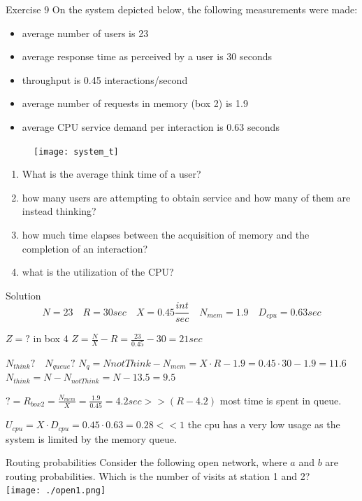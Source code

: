 \documentclass[]{beamer}
\begin{document}
\begin{frame}[allowframebreaks]{Exercise 9}
On the system depicted below, the following measurements were made:
\begin{itemize}
	\item average number of users is 23
	\item average response time as perceived by a user is 30 seconds
	\item throughput is 0.45 interactions/second
	\item average number of requests in memory (box 2) is 1.9
	\item average CPU service demand per interaction is 0.63 seconds
\end{itemize}


\begin{figure}
	\centering
	\texttt{[image: system\_t]}
\end{figure}

\begin{enumerate}
	\item What is the average think time of a user?
	\item how many users are attempting to obtain service and how many of them are instead thinking?
	\item how much time elapses between the acquisition of memory and the completion of an interaction?
	\item what is the utilization of the CPU?
\end{enumerate}
\end{frame}

\begin{frame}{Solution}
$$N=23 \quad R=30sec \quad X=0.45 \frac{int}{sec} \quad N_{mem} = 1.9 \quad D_{cpu} = 0.63 sec$$

$Z = ?$ in box 4 $Z=\frac{N}{X}-R = \frac{23}{0.45}-30 = 21 sec$

$N_{think}? \quad N_{queue}?$ $N_q = N{notThink} - N_{mem} = X\cdot R - 1.9 = 0.45\cdot 30 - 1.9 = 11.6$ $N_{think} = N - N_{notThink} = N - 13.5 = 9.5$

$? = R_{box2} = \frac{N_{mem}}{X} = \frac{1.9}{0.45} = 4.2 sec >> (R-4.2)$ most time is spent in queue.

$U_{cpu} = X \cdot D_{cpu} = 0.45 \cdot 0.63 = 0.28 << 1$ the cpu has a very low usage as the system is limited by the memory queue. 
\end{frame}

\begin{frame}{Routing probabilities}
Consider the following open network, where $a$ and $b$ are routing probabilities. 
Which is the number of visits at station 1 and 2?\\
\texttt{[image: ./open1.png]}
\end{frame}
\end{document}
